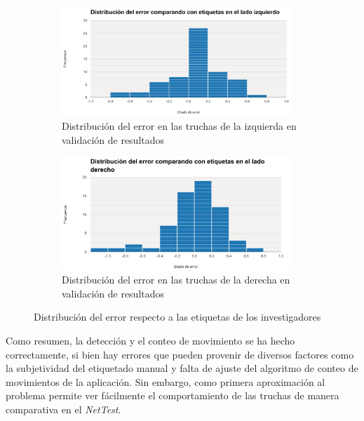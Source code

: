\begin{figure}[H]
    \centering
    \begin{subfigure}[b]{0.95\textwidth}
        \centering
        \includegraphics[width=0.95\textwidth]{images/7/ErrorIzquierda.png}
        \caption{Distribución del error en las truchas de la izquierda en validación de resultados}
    \end{subfigure}
    \begin{subfigure}[b]{0.98\textwidth}
        \centering
        \includegraphics[width=0.95\textwidth]{images/7/ErrorDerecha.png}
        \caption{Distribución del error en las truchas de la derecha en validación de resultados}
    \end{subfigure}
    \caption{Distribución del error respecto a las etiquetas de los investigadores}
    \label{fig:HistogramasError}
\end{figure}

Como resumen, la detección y el conteo de movimiento se ha hecho correctamente, si bien hay errores que pueden provenir de diversos factores como la subjetividad del etiquetado manual y falta de ajuste del algoritmo de conteo 
de movimientos de la aplicación. Sin embargo, como primera aproximación al problema permite ver fácilmente el comportamiento de las truchas de manera comparativa en el \textit{NetTest}.

